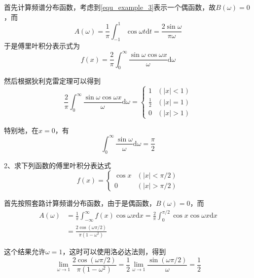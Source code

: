 \documentclass[UTF8,12pt]{ctexart}
\begin{document}
	首先计算频谱分布函数，考虑到\autoref{equ_example_3}表示一个偶函数，故$ B(\omega) =0 $，而
	\begin{equation}
		A(\omega)=\frac{1}{\pi} \int_{-1}^{1} \cos \omega t \mathrm{d} t=\frac{2 \sin \omega}{\pi \omega}
		\end{equation}
\noindent 于是傅里叶积分表示式为
\begin{equation}
	f(x)=\frac{2}{\pi} \int_{0}^{\infty} \frac{\sin \omega \cos \omega x}{\omega} \mathrm{d} \omega
	\end{equation}

\noindent 然后根据狄利克雷定理可以得到
\begin{equation}
\frac{2}{\pi} \int_{0}^{\infty} \frac{\sin \omega \cos \omega x}{\omega} \mathrm{d} \omega=\left\{\begin{array}{ll}{1} & {(|x|<1)} \\ {\frac{1}{2}} & {(|x|=1)} \\ {0} & {(|x|>1)}\end{array}\right.
\end{equation}

\noindent 特别地，在$ x=0 $，有
\begin{equation}
	\int_{0}^{\infty} \frac{\sin \omega}{\omega} \mathrm{d} \omega=\frac{\pi}{2}
	\end{equation}

	2、求下列函数的傅里叶积分表达式
	\begin{equation}
	f(x)=\left\{\begin{array}{ll}{\cos x} & {(|x|<\pi / 2)} \\ {0} & {(|x|>\pi / 2)}\end{array}\right.
	\end{equation}

	首先按照套路计算频谱分布函数，由于是偶函数，$ B (\omega) = 0 $，而
	\begin{equation}
		\begin{aligned}
			A(\omega)&=\frac{1}{\pi} \int_{-\infty}^{\infty} f(x) \cos \omega x \mathrm{d} x=\frac{2}{\pi} \int_{0}^{\pi / 2} \cos x \cos \omega x \mathrm{d} x \\
			&=\frac{2 \cos (\omega \pi / 2)}{\pi\left(1-\omega^{2}\right)}
		\end{aligned}
		\end{equation}
	
\noindent 这个结果允许$ \omega = 1 $，这时可以使用洛必达法则，得到
\begin{equation}
	\lim _{\omega \rightarrow 1} \frac{2 \cos (\omega \pi / 2)}{\pi\left(1-\omega^{2}\right)}=\frac{1}{2} \lim _{\omega \rightarrow 1} \frac{\sin (\omega \pi / 2)}{\omega}=\frac{1}{2}
	\end{equation}
\end{document}
